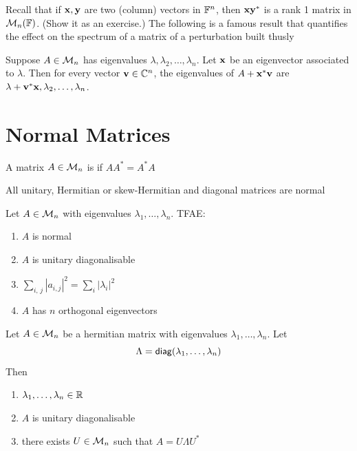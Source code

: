 \documentclass[aspectratio=169]{beamer}
\begin{document}
\begin{frame}
Recall that if $\mathbf{x},\mathbf{y}$ are two (column) vectors in $\mathbb{F}^n$, then $\mathbf{x}\mathbf{y}^*$ is a rank 1 matrix in $\mathcal{M}_n(\mathbb{F})$. (Show it as an exercise.) The following is a famous result that quantifies the effect on the spectrum of a matrix of a perturbation built thusly
\vfill
\begin{theorem}[Brauer]
Suppose $A\in \mathcal{M}_n$ has eigenvalues $\lambda, \lambda_2, \ldots, \lambda_n$. Let $\mathbf{x}$ be an eigenvector associated to $\lambda$. Then for every vector $\mathbf{v}\in \mathbb{C}^n$, the eigenvalues of $A+\mathbf{x}^*\mathbf{v}$ are $\lambda+\mathbf{v}^*\mathbf{x},\lambda_2,\ldots, \lambda_n$.
\end{theorem}
\end{frame}


\section{Normal Matrices}
\begin{frame}
\begin{definition}
A matrix $A\in\mathcal{M}_n$ is  if $AA^*=A^*A$
\end{definition}
\vfill
All unitary, Hermitian or skew-Hermitian and diagonal matrices are normal
\end{frame}


\begin{frame}
\begin{theorem}
Let $A\in \mathcal{M}_n$ with eigenvalues $\lambda_1, \ldots, \lambda_n$. TFAE:
\begin{enumerate}
    \item $A$ is normal
    \item $A$ is unitary diagonalisable
    \item $\sum\limits_{i,\,j} | a_{i,j}|^2= \sum\limits_{i} | \lambda_i|^2$
    \item $A$ has $n$ orthogonal eigenvectors
\end{enumerate}
\end{theorem}
\end{frame}


\begin{frame}
\begin{theorem}
Let $A\in \mathcal{M}_n$ be a hermitian matrix with eigenvalues $\lambda_1, \ldots, \lambda_n$. Let 
\[
	\Lambda = \mathsf{diag}(\lambda_1, \ldots, \lambda_n)
\]
 Then 
\begin{enumerate}
    \item $\lambda_1, \ldots, \lambda_n\in \mathbb{R}$
    \item $A$ is unitary diagonalisable
    \item there exists $U\in \mathcal{M}_n$ such that $A= U\Lambda U^*$
\end{enumerate}
\end{theorem}
\end{frame}
\end{document}
